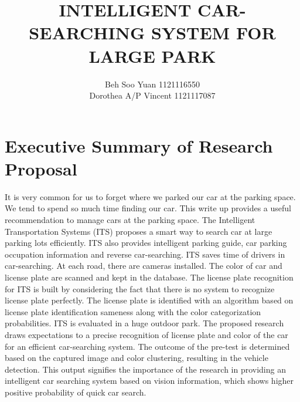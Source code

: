 \documentclass[12pt]{article}
\title{INTELLIGENT CAR-SEARCHING SYSTEM FOR LARGE PARK}
\author{Beh Soo Yuan 1121116550\\Dorothea A/P Vincent 1121117087}
\begin{document}
\maketitle

\section{Executive Summary of Research Proposal}
It is very common for us to forget where we parked our car at the parking space. We tend to spend so much time finding our car. This write up provides a useful recommendation to manage cars at the parking space. The Intelligent Transportation Systems (ITS) proposes a smart way to search car at large parking lots efficiently. ITS also provides intelligent parking guide, car parking occupation information and reverse car-searching. ITS saves time of drivers in car-searching. At each road, there are cameras installed. The color of car and license plate are scanned and kept in the database. The license plate recognition for ITS is built by considering the fact that there is no system to recognize license plate perfectly. The license plate is identified with an algorithm based on license plate identification sameness along with the color categorization probabilities. ITS is evaluated in a huge outdoor park. The proposed research draws expectations to a precise recognition of license plate and color of the car for an efficient car-searching system. The outcome of the pre-test is determined based on the captured image and color clustering, resulting in the vehicle detection. This output signifies the importance of the research in providing an intelligent car searching system based on vision information, which shows higher positive probability of quick car search.
\end{document}
